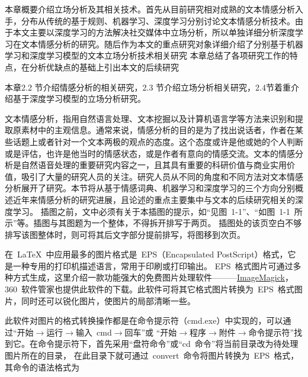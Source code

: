 

本章概要介绍立场分析及其相关技术。首先从目前研究相对成熟的文本情感分析入手，分布从传统的基于规则、机器学习、深度学习分别讨论文本情感分析技术。由于本文主要以深度学习的方法解决社交媒体中立场分析，所以单独详细分析深度学习在文本情感分析的研究。随后作为本文的重点研究对象详细介绍了分别基于机器学习和深度学习模型的文本立场分析技术相关研究 本章总结了各项研究工作的特点，在分析优缺点的基础上引出本文的后续研究

本章2.2 节介绍情感分析的相关研究，2.3 节介绍立场分析相关研究，2.4节着重介绍基于深度学习模型的立场分析研究。

文本情感分析，指用自然语言处理、文本挖掘以及计算机语言学等方法来识别和提取原素材中的主观信息。通常来说，情感分析的目的是为了找出说话者，作者在某些话题上或者针对一个文本两极的观点的态度。这个态度或许是他或她的个人判断或是评估，也许是他当时的情感状态，或是作者有意向的情感交流。文本的情感分析是自然语音处理的重要研究内容之一，且其具有重要的科研价值与商业实用价值，吸引了大量的研究人员的关注。研究人员从不同的角度和不同方法对文本情感分析展开了研究。本节将从基于情感词典、机器学习和深度学习的三个方向分别概述近年来情感分析的研究进展，且论述的重点主要集中与文本的后续研究相关的深度学习。
插图之前，文中必须有关于本插图的提示，如“见图~1-1”、“如图~1-1~所示”等。插图与其图题为一个整体，不得拆开排写于两页。
插图处的该页空白不够排写该图整体时，则可将其后文字部分提前排写，将图移到次页。

在~\LaTeX~中应用最多的图片格式是~EPS（Encapsulated PostScript）格式，它是一种专用的打印机描述语言，常用于印刷或打印输出。
EPS~格式图片可通过多种方式生成，这里介绍一款功能强大的免费图片处理软件———\href{http://www.imagemagick.org/}{ImageMagick}，
360~软件管家也提供此软件的下载。此软件可将其它格式图片转换为~EPS~格式图片，同时还可以锐化图片，使图片的局部清晰一些。

此软件对图片的格式转换操作都是在命令提示符（cmd.exe）中实现的，可以通过“开始$\to$运行$\to$输入~cmd$\to$回车”或
“开始$\to$程序$\to$附件$\to$命令提示符”找到它。在命令提示符下，首先采用“盘符命令”或“cd~命令”将当前目录改为待处理图片所在的目录，
在此目录下就可通过~convert~命令将图片转换为~EPS~格式，其命令的语法格式为

